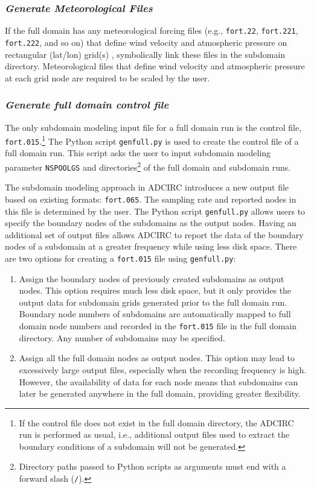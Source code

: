 \documentclass[11pt,titlepage]{article}
\begin{document}
\subsubsection*{\emph{Generate Meteorological Files}}

If the full domain has any meteorological
forcing files (e.g., \verb+fort.22+, \verb+fort.221+, \verb+fort.222+,
and so on) that define wind velocity and atmospheric pressure on 
rectangular (lat/lon) grid(s) , symbolically link these files in the 
subdomain directory. Meteorological files that define wind velocity
and atmospheric pressure at each grid node are required to be 
scaled by the user.


\subsubsection*{\emph{Generate full domain control file}}

The only subdomain modeling input file for a full domain run is the
control file, \verb+fort.015+.\footnote{If the control file does not
exist in the full domain directory, the ADCIRC run is performed as
usual, i.e., additional output files used to extract the boundary
conditions of a subdomain will not be generated.} The Python script
\verb+genfull.py+ is used to create the control file of a full domain
run. This script asks the user to input subdomain modeling parameter
\texttt{NSPOOLGS}
and directories\footnote{Directory paths passed to Python scripts as
arguments must end with a forward slash (\texttt{/}).} of the full
domain and subdomain runs.

The subdomain modeling approach in ADCIRC introduces a new output file
based on existing formats: \verb+fort.065+.
The sampling rate and reported nodes in this file is determined by
the user. The Python script \verb+genfull.py+ allows users to specify
the boundary nodes of the subdomains as the output nodes. Having an additional
set of output files allows ADCIRC to report the data of the boundary
nodes of a subdomain at a greater frequency while using less disk
space. There are two options for creating a \verb+fort.015+ file using
\verb+genfull.py+:

\begin{enumerate}
\item Assign the boundary nodes of previously created subdomains as
  output nodes. This option requires much less disk space, but it only 
  provides the output data for subdomain grids
  generated prior to the full domain run. Boundary node numbers of
  subdomains are automatically mapped to full domain node numbers and
  recorded in the \verb+fort.015+ file in the full domain
  directory. Any number of subdomains may be specified.

\item Assign all the full domain nodes as output nodes. This option may
  lead to excessively large output files, especially when the
  recording frequency is high. However, the availability of data for
  each node means that subdomains can later be generated anywhere in
  the full domain, providing greater flexibility.

\end{enumerate}
\end{document}
